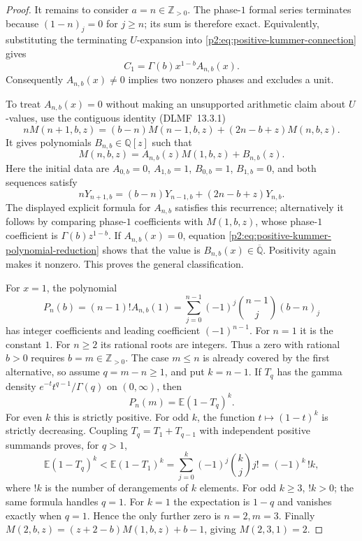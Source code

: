 \documentclass[11pt,a4paper]{article}
\theoremstyle{definition}
\theoremstyle{remark}
\numberwithin{equation}{section}
\begin{document}
\begin{proof}
It remains to consider $a=n\in\mathbb Z_{>0}$.  The phase-$1$
formal series terminates because $(1-n)_j=0$ for $j\ge n$;
its sum is therefore exact.  Equivalently, substituting the terminating
$U$-expansion into \eqref{p2:eq:positive-kummer-connection} gives
\begin{equation}
\label{p2:eq:positive-kummer-C1}
 C_1=\Gamma(b)x^{1-b}A_{n,b}(x).
\end{equation}
Consequently $A_{n,b}(x)\ne0$ implies two nonzero phases and excludes a
unit.

To treat $A_{n,b}(x)=0$ without making an unsupported arithmetic claim
about $U$-values, use the contiguous identity (DLMF~13.3.1)
\[
 nM(n+1,b,z)=(b-n)M(n-1,b,z)+(2n-b+z)M(n,b,z).
\]
It gives polynomials $B_{n,b}\in\mathbb Q[z]$ such that
\begin{equation}
\label{p2:eq:positive-kummer-polynomial-reduction}
 M(n,b,z)=A_{n,b}(z)M(1,b,z)+B_{n,b}(z).
\end{equation}
Here the initial data are $A_{0,b}=0$, $A_{1,b}=1$,
$B_{0,b}=1$, $B_{1,b}=0$, and both sequences satisfy
\[
 nY_{n+1,b}=(b-n)Y_{n-1,b}+(2n-b+z)Y_{n,b}.
\]
The displayed explicit formula for $A_{n,b}$ satisfies this recurrence;
alternatively it follows by comparing phase-$1$ coefficients with
$M(1,b,z)$, whose phase-$1$ coefficient is $\Gamma(b)z^{1-b}$.
If $A_{n,b}(x)=0$, equation
\eqref{p2:eq:positive-kummer-polynomial-reduction} shows that the value is
$B_{n,b}(x)\in\overline{\mathbb Q}$.  Positivity again makes it nonzero.
This proves the general classification.

For $x=1$, the polynomial
\[
 P_n(b)=(n-1)!A_{n,b}(1)
    =\sum_{j=0}^{n-1}(-1)^j\binom{n-1}{j}(b-n)_j
\]
has integer coefficients and leading coefficient $(-1)^{n-1}$.
For $n=1$ it is the constant $1$.  For $n\ge2$ its rational roots are
integers.  Thus a zero with rational $b>0$ requires $b=m\in\mathbb Z_{>0}$.
The case $m\le n$ is already covered by the first alternative, so assume
$q=m-n\ge1$, and put $k=n-1$.  If $T_q$ has the gamma density
$e^{-t}t^{q-1}/\Gamma(q)$ on $(0,\infty)$, then
\[
 P_n(m)=\mathbb E(1-T_q)^k.
\]
For even $k$ this is strictly positive.  For odd $k$, the function
$t\mapsto(1-t)^k$ is strictly decreasing.  Coupling
$T_q=T_1+T_{q-1}$ with independent positive summands proves, for $q>1$,
\[
 \mathbb E(1-T_q)^k<\mathbb E(1-T_1)^k
 =\sum_{j=0}^{k}(-1)^j\binom{k}{j}j!
 =(-1)^k\, !k,
\]
where $!k$ is the number of derangements of $k$ elements.
For odd $k\ge3$, $!k>0$; the same formula handles $q=1$.
For $k=1$ the expectation is $1-q$ and vanishes exactly when $q=1$.
Hence the only further zero is $n=2,m=3$.
Finally $M(2,b,z)=(z+2-b)M(1,b,z)+b-1$, giving $M(2,3,1)=2$.
\end{proof}
\end{document}
